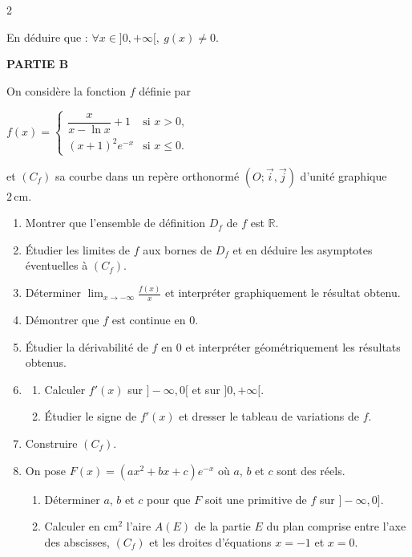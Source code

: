 \documentclass[12pt,a4paper]{article}
\begin{document}
\begin{multicols}{2}
\begin{enumerate}
En déduire que : \( \forall x\in]0,+\infty[, \ g(x)\neq 0. \)
\end{enumerate}

\textbf{PARTIE B}

On considère la fonction $f$ définie par

\(
f(x)=
\begin{cases}
\dfrac{x}{x-\ln x}+1 & \text{si } x>0,\\[0.3cm]
(x+1)^2e^{-x} & \text{si } x\le 0.
\end{cases}
\)

et $(C_f)$ sa courbe dans un repère orthonormé $(O;\vec{i},\vec{j})$ d’unité graphique \(2\,\text{cm}\).

\begin{enumerate}
\item Montrer que l’ensemble de définition $D_f$ de $f$ est $\mathbb{R}$.

\item Étudier les limites de $f$ aux bornes de $D_f$ et en déduire les asymptotes éventuelles à $(C_f)$.

\item Déterminer \( \displaystyle \lim_{x\to-\infty}\frac{f(x)}{x} \) et interpréter graphiquement le résultat obtenu.

\item Démontrer que $f$ est continue en $0$.

\item Étudier la dérivabilité de $f$ en $0$ et interpréter géométriquement les résultats obtenus.

\item 
\begin{enumerate}
\item Calculer $f'(x)$ sur $]-\infty,0[$ et sur $]0,+\infty[$.
\item Étudier le signe de $f'(x)$ et dresser le tableau de variations de $f$.
\end{enumerate}

\item Construire $(C_f)$.

\item On pose \( F(x)=(ax^2+bx+c)e^{-x} \) où $a$, $b$ et $c$ sont des réels.
\begin{enumerate}
\item Déterminer $a$, $b$ et $c$ pour que $F$ soit une primitive de $f$ sur $]-\infty,0]$.
\item Calculer en cm$^2$ l’aire \( A(E) \) de la partie $E$ du plan comprise entre l’axe des abscisses, $(C_f)$ et les droites d’équations \( x=-1 \) et \( x=0 \).
\end{enumerate}


\end{enumerate}
\end{multicols}
\end{document}
